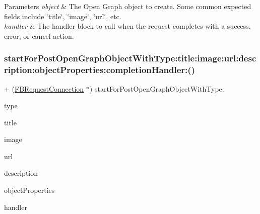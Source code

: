 \begin{DoxyParams}{Parameters}
{\em object} & The Open Graph object to create. Some common expected fields include \char`\"{}title\char`\"{}, \char`\"{}image\char`\"{}, \char`\"{}url\char`\"{}, etc.\\
\hline
{\em handler} & The handler block to call when the request completes with a success, error, or cancel action. \\
\hline
\end{DoxyParams}
\mbox{\label{interfaceFBRequestConnection_a98c88d095d77cc16d000fb9ce51d39e1}} 
\subsubsection{\texorpdfstring{start\+For\+Post\+Open\+Graph\+Object\+With\+Type\+:title\+:image\+:url\+:description\+:object\+Properties\+:completion\+Handler\+:()}{startForPostOpenGraphObjectWithType:title:image:url:description:objectProperties:completionHandler:()}\hspace{0.1cm}{\footnotesize\ttfamily [1/5]}}
{\footnotesize\ttfamily + (\hyperlink{interfaceFBRequestConnection}{F\+B\+Request\+Connection} $\ast$) start\+For\+Post\+Open\+Graph\+Object\+With\+Type\+: \begin{DoxyParamCaption}\item[{(N\+S\+String $\ast$)}]{type }\item[{title:(N\+S\+String $\ast$)}]{title }\item[{image:(id)}]{image }\item[{url:(id)}]{url }\item[{description:(N\+S\+String $\ast$)}]{description }\item[{objectProperties:(N\+S\+Dictionary $\ast$)}]{object\+Properties }\item[{completionHandler:(F\+B\+Request\+Handler)}]{handler }\end{DoxyParamCaption}}

